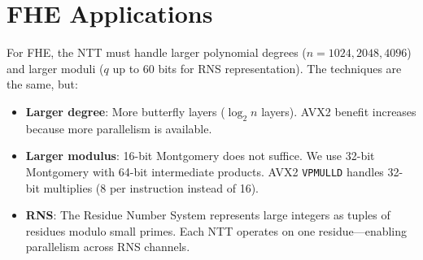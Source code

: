 \section{FHE Applications}


For FHE, the NTT must handle larger polynomial degrees ($n = 1024, 2048, 4096$) and
larger moduli ($q$ up to 60 bits for RNS representation). The techniques are the same,
but:

\begin{itemize}[nosep]
  \item \textbf{Larger degree}: More butterfly layers ($\log_2 n$ layers). AVX2 benefit
    increases because more parallelism is available.
  \item \textbf{Larger modulus}: 16-bit Montgomery does not suffice. We use 32-bit
    Montgomery with 64-bit intermediate products. AVX2 \texttt{VPMULLD} handles 32-bit
    multiplies (8 per instruction instead of 16).
  \item \textbf{RNS}: The Residue Number System represents large integers as tuples of
    residues modulo small primes. Each NTT operates on one residue---enabling parallelism
    across RNS channels.
\end{itemize}


